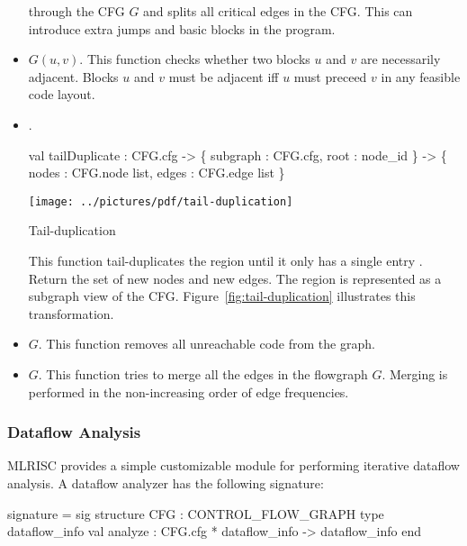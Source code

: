 \begin{itemize}
        through the CFG $G$ and splits
      all critical edges in the CFG.
      This can introduce extra jumps and basic blocks in the program.
  \item  {} $G (u,v)$.   This function
      checks whether two blocks $u$ and $v$ are necessarily adjacent.
      Blocks $u$ and $v$ must be adjacent iff $u$ must preceed $v$
      in any feasible code layout.
  \item  {}.  
   \begin{SML}
    val tailDuplicate : CFG.cfg -> \{ subgraph : CFG.cfg, root : node_id \} 
                                -> \{ nodes : CFG.node list, 
                                     edges : CFG.edge list \} 
   \end{SML}
\begin{Figure}
\begin{boxit}
\begin{center}
  \texttt{[image: ../pictures/pdf/tail-duplication]}
\end{center}%
\end{boxit}
\label{fig:tail-duplication} 
\caption{Tail-duplication}
\end{Figure}

      This function tail-duplicates the region 
      until it only has a single entry .
      Return the set of new nodes and new edges.  
      The region is represented as a subgraph view of the CFG.
      Figure~\ref{fig:tail-duplication} illustrates 
      this transformation.

  \item  {} $G$. This function
          removes all unreachable code  from the graph.
  \item  {} $G$.  This function tries to merge all
         the edges in the flowgraph $G$.  Merging is performed in the
         non-increasing order of edge frequencies. 
\end{itemize}

\subsubsection{Dataflow Analysis}
MLRISC provides a simple customizable module for performing
iterative dataflow analysis.   A dataflow analyzer
has the following signature:

\begin{SML}
 signature  = sig
   structure CFG : CONTROL_FLOW_GRAPH
   type dataflow_info
   val analyze : CFG.cfg * dataflow_info -> dataflow_info
 end
\end{SML}

